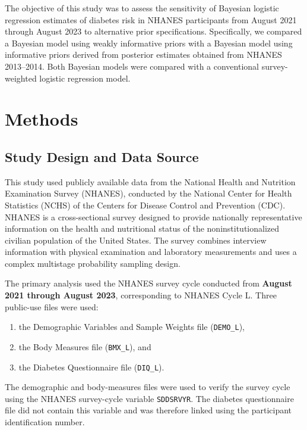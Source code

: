 \documentclass[12pt]{article}
\begin{document}
The objective of this study was to assess the sensitivity of Bayesian logistic regression estimates of diabetes risk in NHANES participants from August 2021 through August 2023 to alternative prior specifications. Specifically, we compared a Bayesian model using weakly informative priors with a Bayesian model using informative priors derived from posterior estimates obtained from NHANES 2013--2014. Both Bayesian models were compared with a conventional survey-weighted logistic regression model.


\section{Methods}

\subsection{Study Design and Data Source}

This study used publicly available data from the National Health and Nutrition Examination Survey (NHANES), conducted by the National Center for Health Statistics (NCHS) of the Centers for Disease Control and Prevention (CDC). NHANES is a cross-sectional survey designed to provide nationally representative information on the health and nutritional status of the noninstitutionalized civilian population of the United States. The survey combines interview information with physical examination and laboratory measurements and uses a complex multistage probability sampling design.

The primary analysis used the NHANES survey cycle conducted from \textbf{August 2021 through August 2023}, corresponding to NHANES Cycle L. Three public-use files were used:

\begin{enumerate}[label=(\alph*)]
    \item the Demographic Variables and Sample Weights file (\texttt{DEMO\_L}),
    \item the Body Measures file (\texttt{BMX\_L}), and
    \item the Diabetes Questionnaire file (\texttt{DIQ\_L}).
\end{enumerate}

The demographic and body-measures files were used to verify the survey cycle using the NHANES survey-cycle variable \texttt{SDDSRVYR}. The diabetes questionnaire file did not contain this variable and was therefore linked using the participant identification number.
\end{document}
